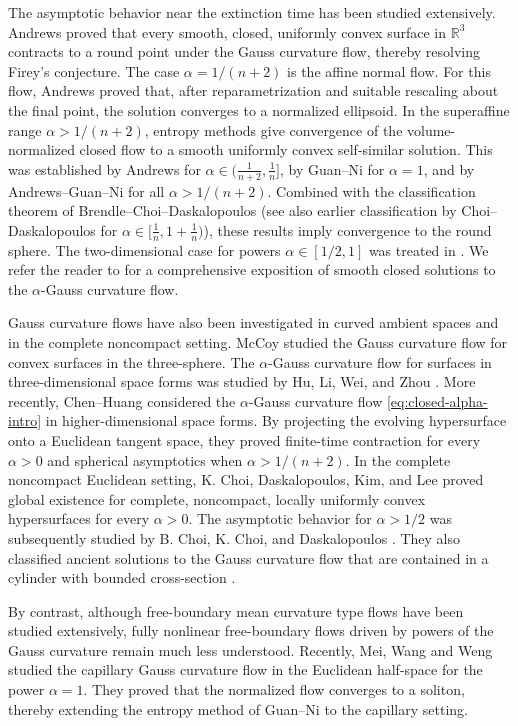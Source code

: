 \documentclass[11pt, reqno]{amsart}
\theoremstyle{remark}
\theoremstyle{definition}
\numberwithin{equation}{section}
\begin{document}
The asymptotic behavior near the extinction time has been studied extensively.  Andrews \cite{And99} proved that every smooth, closed, uniformly convex surface in $\mathbb{R}^3$ contracts to a round point under the Gauss curvature flow, thereby resolving Firey's conjecture.  The case $\alpha={1}/{(n+2)}$ is the affine normal flow.  For this flow, Andrews \cite{And96} proved that, after reparametrization and suitable rescaling about the final point, the solution converges to a normalized ellipsoid.  In the superaffine range $\alpha>1/(n+2)$, entropy methods give convergence of the volume-normalized closed flow to a smooth uniformly convex self-similar solution.  This was established by Andrews \cite{And00} for $\alpha\in (\frac{1}{n+2}, \frac{1}{n}]$, by Guan--Ni \cite{GN17} for $\alpha=1$, and by Andrews--Guan--Ni \cite{AGN2016} for all $\alpha>1/(n+2)$.  Combined with the classification theorem of Brendle--Choi--Daskalopoulos \cite{BCD2017} (see also earlier classification by Choi--Daskalopoulos \cite{CD16} for $\alpha\in [\frac{1}{n},1+\frac{1}{n})$), these results imply convergence to the round sphere.  The two-dimensional case for powers $\alpha\in [1/2,1]$ was treated in \cite{AC12}.  We refer the reader to \cite[Chapters 15--17]{Andbook} for a comprehensive exposition of smooth closed solutions to the $\alpha$-Gauss curvature flow.

Gauss curvature flows have also been investigated in curved ambient spaces and in the complete noncompact setting.  McCoy \cite{McC18} studied the Gauss curvature flow for convex surfaces in the three-sphere.  The $\alpha$-Gauss curvature flow for surfaces in three-dimensional space forms was studied by Hu, Li, Wei, and Zhou \cite{HLWZ20}.  More recently, Chen--Huang \cite{CH2024} considered the $\alpha$-Gauss curvature flow \eqref{eq:closed-alpha-intro} in higher-dimensional space forms.  By projecting the evolving hypersurface onto a Euclidean tangent space, they proved finite-time contraction for every $\alpha>0$ and spherical asymptotics when $\alpha>1/(n+2)$.  In the complete noncompact Euclidean setting, K. Choi, Daskalopoulos, Kim, and Lee \cite{CDKL19} proved global existence for complete, noncompact, locally uniformly convex hypersurfaces for every $\alpha>0$.  The asymptotic behavior for $\alpha>{1}/{2}$ was subsequently studied by B. Choi, K. Choi, and Daskalopoulos \cite{CCD22}.  They also classified ancient solutions to the Gauss curvature flow that are contained in a cylinder with bounded cross-section \cite{CCD24}.

By contrast, although free-boundary mean curvature type flows
have been studied extensively, fully nonlinear free-boundary
flows driven by powers of the Gauss curvature remain much less
understood. Recently, Mei, Wang and Weng \cite{MWW25} studied the
capillary Gauss curvature flow in the Euclidean half-space for the
power $\alpha=1$. They proved that the normalized flow converges to a
soliton, thereby extending the entropy method of Guan--Ni
\cite{GN17} to the capillary setting.
\end{document}
